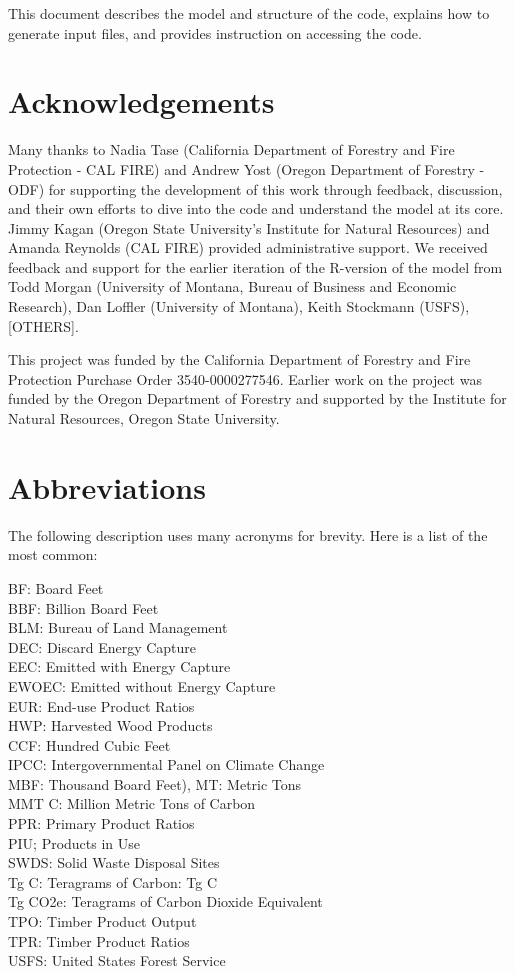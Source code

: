 \documentclass[
  openany]{book}
\begin{document}
This document describes the model and structure of the code, explains
how to generate input files, and provides instruction on accessing the
code.

\hypertarget{sum-ack}{%
\section{Acknowledgements}\label{sum-ack}}

Many thanks to Nadia Tase (California Department of Forestry and Fire
Protection - CAL FIRE) and Andrew Yost (Oregon Department of Forestry -
ODF) for supporting the development of this work through feedback,
discussion, and their own efforts to dive into the code and understand
the model at its core. Jimmy Kagan (Oregon State University's Institute
for Natural Resources) and Amanda Reynolds (CAL FIRE) provided
administrative support. We received feedback and support for the earlier
iteration of the R-version of the model from Todd Morgan (University of
Montana, Bureau of Business and Economic Research), Dan Loffler
(University of Montana), Keith Stockmann (USFS), {[}OTHERS{]}.

This project was funded by the California Department of Forestry and
Fire Protection Purchase Order 3540-0000277546. Earlier work on the
project was funded by the Oregon Department of Forestry and supported by
the Institute for Natural Resources, Oregon State University.

\hypertarget{sum-abb}{%
\section{Abbreviations}\label{sum-abb}}

The following description uses many acronyms for brevity. Here is a list
of the most common:

BF: Board Feet\\
BBF: Billion Board Feet\\
BLM: Bureau of Land Management\\
DEC: Discard Energy Capture\\
EEC: Emitted with Energy Capture\\
EWOEC: Emitted without Energy Capture\\
EUR: End-use Product Ratios\\
HWP: Harvested Wood Products\\
CCF: Hundred Cubic Feet\\
IPCC: Intergovernmental Panel on Climate Change\\
MBF: Thousand Board Feet), MT: Metric Tons\\
MMT C: Million Metric Tons of Carbon\\
PPR: Primary Product Ratios\\
PIU; Products in Use\\
SWDS: Solid Waste Disposal Sites\\
Tg C: Teragrams of Carbon: Tg C\\
Tg CO2e: Teragrams of Carbon Dioxide Equivalent\\
TPO: Timber Product Output\\
TPR: Timber Product Ratios\\
USFS: United States Forest Service
\end{document}
